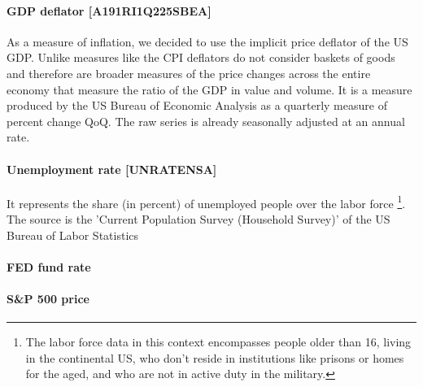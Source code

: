 \documentclass[hidelinks,12pts]{article}
\DeclareMathOperator{\1}{\mathbbm{1}}
\begin{document}
\paragraph{GDP deflator [A191RI1Q225SBEA]}  
As a measure of inflation, we decided to use the implicit price deflator of the US GDP. 
Unlike measures like the CPI deflators do not consider baskets of goods and therefore are broader measures of the price changes across the entire economy that measure the ratio of the GDP in value and volume. 
It is a measure produced by the US Bureau of Economic Analysis as a quarterly measure of percent change QoQ. 
The raw series is already seasonally adjusted at an annual rate. 


\paragraph{Unemployment rate [UNRATENSA]}
It represents the share (in percent) of unemployed people over the labor force \footnote{The labor force data in this context encompasses people older than 16, living in the continental US, who don't reside in institutions like prisons or homes for the aged, and who are not in active duty in the military.}. 
The source is the 'Current Population Survey (Household Survey)' of the US Bureau of Labor Statistics


\paragraph{FED fund rate}

\paragraph{S\&P 500 price}
\end{document}
